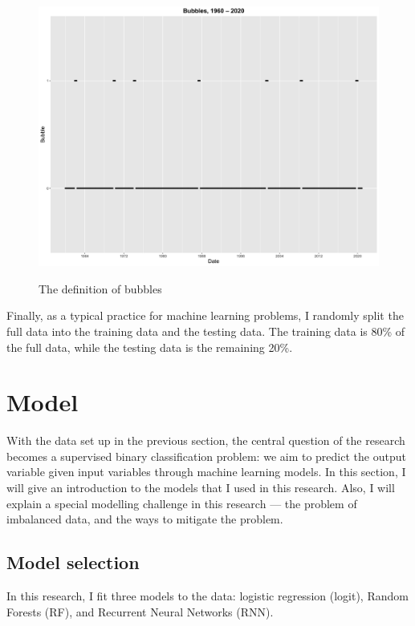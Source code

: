 \documentclass[12pt, man, a4paper, floatsintext]{apa7}
\begin{document}
\begin{figure}
    \centering
    \caption{The definition of bubbles}
    \includegraphics[width=15cm]{bubble_def.png}
    \label{fig:bubble_def}
\end{figure}



Finally, as a typical practice for machine learning problems, I randomly split the full data into the training data and the testing data. The training data is 80\% of the full data, while the testing data is the remaining 20\%.

    \section{Model}

With the data set up in the previous section, the central question of the research becomes a supervised binary classification problem: we aim to predict the output variable given input variables through machine learning models. In this section, I will give an introduction to the models that I used in this research. Also, I will explain a special modelling challenge in this research — the problem of imbalanced data, and the ways to mitigate the problem.

\subsection{Model selection}

In this research, I fit three models to the data: logistic regression (logit), Random Forests (RF), and Recurrent Neural Networks (RNN).
\end{document}
